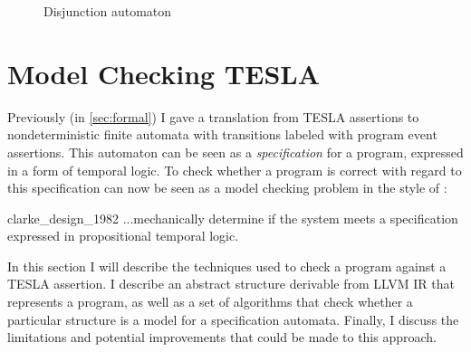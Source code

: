 \begin{figure}[ht]
  \centering
  \caption{Disjunction automaton}
  \label{fig:disj-auto}
\end{figure}

\section{Model Checking TESLA} \label{sec:checking}

Previously (in \autoref{sec:formal}) I gave a translation from TESLA assertions
to nondeterministic finite automata with transitions labeled with program event
assertions. This automaton can be seen as a \emph{specification} for a program,
expressed in a form of temporal logic. To check whether a program is correct
with regard to this specification can now be seen as a model checking problem in
the style of \textcite{clarke_design_1982}:

\begin{displaycquote}[p. 2]{clarke_design_1982}
  ...mechanically determine if the system meets a specification expressed in
  propositional temporal logic.
\end{displaycquote}

In this section I will describe the techniques used to check a program against a
TESLA assertion. I describe an abstract structure derivable from LLVM IR that
represents a program, as well as a set of algorithms that check whether a
particular structure is a model for a specification automata. Finally, I discuss
the limitations and potential improvements that could be made to this approach.

